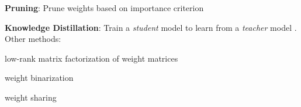 \documentclass{beamer}
\let\tempone\itemize
\let\temptwo\enditemize
\renewenvironment{itemize}{\tempone\addtolength{\itemsep}{0.5\baselineskip}}{\temptwo}
\newcommand{\air}{\vspace{0.25cm}}
\newcommand{\given}{\,|\,}
\newcommand{\xvec}{\mathbf{x}}
\newcommand{\yvec}{\mathbf{y}}
\newcommand{\Cite}[1]{{\footnotesize \citep{#1}}}
\begin{document}
\begin{frame}
  \centerline{}
\air

\begin{itemize}
\item \textbf{Pruning}: Prune weights based on importance criterion 
\Cite{LeCun1990,Han2016}
\item \textbf{Knowledge Distillation}: Train a \textit{student} model to learn 
from a \textit{teacher} model \Cite{Bucila2006,Ba2014,Hinton2015}.
\end{itemize}
\air
Other methods: 
\begin{itemize}
\item low-rank matrix factorization of weight matrices \Cite{Denton2014}
\item weight binarization \Cite{Lin2016}
\item weight sharing \Cite{Chen2015}
\end{itemize}
\end{frame}




\end{document}
